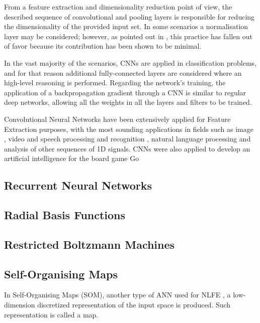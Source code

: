\documentclass[9pt,journal,compsoc]{IEEEtran}
\begin{document}
From a feature extraction and dimensionality reduction point of view, the described sequence of convolutional and pooling layers is responsible for reducing the dimensionality of the provided input set. In some scenarios a normalisation layer may be considered; however, as pointed out in \cite{cs2312017convolutional}, this practice has fallen out of favor because its contribution has been shown to be minimal.

In the vast majority of the scenarios, CNNs are applied in classification problems, and for that reason additional fully-connected layers are considered where an high-level reasoning is performed. Regarding the network's training, the application of a backpropagation gradient through a CNN is similar to regular deep networks, allowing all the weights in all the layers and filters to be trained.

Convolutional Neural Networks have been extensively applied for Feature Extraction purposes, with the most sounding applications in fields such as image \cite{lawrence1997face, krizhevsky2012imagenet}, video \cite{karpathy2014large} and speech processing and recognition \cite{lecun1995convolutional, abdel2012applying}, natural language processing \cite{hu2014convolutional} and analysis of other sequences of 1D signals. CNNs were also applied to develop an artificial intelligence for the board game Go\cite{clark2014teaching, maddison2014move}

\subsection{Recurrent Neural Networks}

\subsection{Radial Basis Functions}

\subsection{Restricted Boltzmann Machines}

\subsection{Self-Organising Maps}

In Self-Organising Maps (SOM), another type of ANN used for NLFE \cite{jain2000statistical, hira2015review}, a low-dimension discretized representation of the input space is produced. Such representation is called a map.
\end{document}
